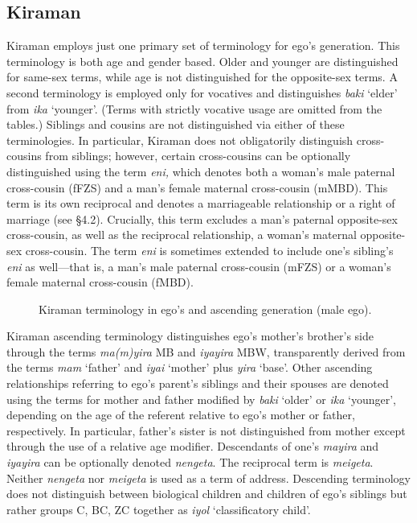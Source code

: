 \subsection{Kiraman}
Kiraman employs just one primary set of terminology for ego's generation. This terminology is both age and gender based. Older and younger are distinguished for same-sex terms, while age is not distinguished for the opposite-sex terms. A second terminology is employed only for vocatives and distinguishes \textit{baki} `elder' from \textit{ika} `younger'. (Terms with strictly vocative usage are omitted from the tables.) Siblings and cousins are not distinguished via either of these terminologies. In particular, Kiraman does not obligatorily distinguish cross-cousins from siblings; however, certain cross-cousins can be optionally distinguished using the term \textit{eni,} which denotes both a woman's male paternal cross-cousin (fFZS) and a man's female maternal cross-cousin (mMBD). This term is its own reciprocal and denotes a marriageable relationship or a right of marriage (see {\S}4.2). Crucially, this term excludes a man's paternal opposite-sex cross-cousin, as well as the reciprocal relationship, a woman's maternal opposite-sex cross-cousin. The term\textit{ eni} is sometimes extended to include one's sibling's \textit{eni} as well---that is, a man's male paternal cross-cousin (mFZS) or a woman's female maternal cross-cousin (fMBD).

\begin{figure}
\caption{Kiraman terminology in ego's and ascending generation (male ego).}
\end{figure}

Kiraman ascending terminology distinguishes ego's mother's brother's side through the terms \textit{ma(m)yira} MB and \textit{iyayira} MBW, transparently derived from the terms \textit{mam} `father' and \textit{iyai} `mother' plus \textit{yira} `base'. Other ascending relationships referring to ego's parent's siblings and their spouses are denoted using the terms for mother and father modified by \textit{baki} `older' or \textit{ika} `younger', depending on the age of the referent relative to ego's mother or father, respectively. In particular, father's sister is not distinguished from mother except through the use of a relative age modifier. Descendants of one's \textit{mayira} and \textit{iyayira} can be optionally denoted \textit{nengeta}. The reciprocal term is \textit{meigeta}. Neither \textit{nengeta} nor \textit{meigeta} is used as a term of address. Descending terminology does not distinguish between biological children and children of ego's siblings but rather groups C, BC, ZC together as \textit{iyol} `classificatory child'.

